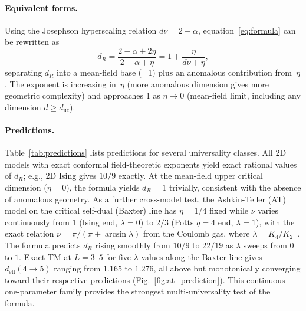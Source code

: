 \documentclass[aps,prl,twocolumn,superscriptaddress,showpacs]{revtex4-2}
\newcommand{\Scal}{R}
\newcommand{\dR}{d_{\Scal}}
\begin{document}
\paragraph{Equivalent forms.}
Using the Josephson hyperscaling relation $d\nu = 2 - \alpha$,
equation~\eqref{eq:formula} can be rewritten as
\begin{equation}
  \dR = \frac{2-\alpha + 2\eta}{2-\alpha + \eta} = 1 + \frac{\eta}{d\nu + \eta},
  \label{eq:formula-alt}
\end{equation}
separating $\dR$ into a mean-field base (=1) plus an anomalous contribution
from~$\eta$. The exponent is increasing in~$\eta$ (more anomalous dimension
gives more geometric complexity) and approaches 1 as $\eta \to 0$
(mean-field limit, including any dimension $d \geq d_\mathrm{uc}$).

\paragraph{Predictions.}
Table~\ref{tab:predictions} lists predictions for several universality
classes. All 2D models with exact conformal field-theoretic exponents
yield exact rational values of $\dR$; e.g., 2D Ising gives $10/9$ exactly.
At the mean-field upper critical dimension ($\eta = 0$), the formula yields
$\dR = 1$ trivially, consistent with the absence of anomalous geometry.
As a further cross-model test, the Ashkin-Teller (AT) model on the critical
self-dual (Baxter) line has $\eta = 1/4$ fixed while $\nu$ varies
continuously from $1$ (Ising end, $\lambda=0$) to $2/3$ (Potts $q=4$ end,
$\lambda=1$), with the exact relation
$\nu = \pi/(\pi + \arcsin\lambda)$ from the Coulomb gas,
where $\lambda = K_4/K_2$~\cite{Nienhuis1987}. The formula predicts $\dR$
rising smoothly from $10/9$ to $22/19$ as $\lambda$ sweeps from $0$ to $1$.
Exact TM at $L = 3$--$5$ for five $\lambda$ values along the Baxter line
gives $d_\mathrm{eff}(4{\to}5)$ ranging from $1.165$ to $1.276$, all above
but monotonically converging toward their respective predictions
(Fig.~\ref{fig:at_prediction}). This continuous one-parameter family
provides the strongest multi-universality test of the formula.
\end{document}
